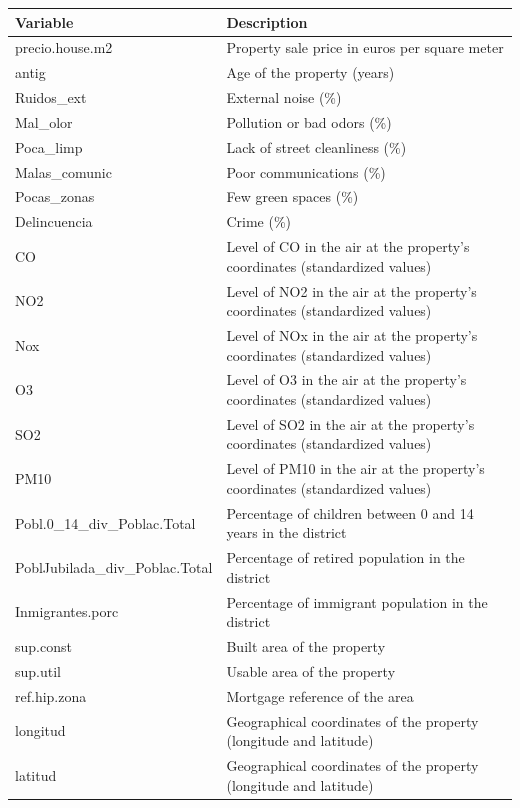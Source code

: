 \documentclass[11pt]{report} %
\begin{document}
\begin{longtable}[H]
\centering
\caption{Continuous Variables in Data Set}
\label{tab:cont_table}
\begin{tabular}{@{}lp{10cm}@{}}
\toprule
\textbf{Variable} & \textbf{Description} \\ \midrule
precio.house.m2 & Property sale price in euros per square meter \\ 
antig & Age of the property (years) \\ 
Ruidos\_ext & External noise (\%) \\ 
Mal\_olor & Pollution or bad odors (\%) \\ 
Poca\_limp & Lack of street cleanliness (\%) \\ 
Malas\_comunic & Poor communications (\%) \\ 
Pocas\_zonas & Few green spaces (\%) \\ 
Delincuencia & Crime (\%) \\ 
CO & Level of CO in the air at the property's coordinates (standardized values) \\ 
NO2 & Level of NO2 in the air at the property's coordinates (standardized values) \\ 
Nox & Level of NOx in the air at the property's coordinates (standardized values) \\ 
O3 & Level of O3 in the air at the property's coordinates (standardized values) \\ 
SO2 & Level of SO2 in the air at the property's coordinates (standardized values) \\ 
PM10 & Level of PM10 in the air at the property's coordinates (standardized values) \\ 
Pobl.0\_14\_div\_Poblac.Total & Percentage of children between 0 and 14 years in the district \\ 
PoblJubilada\_div\_Poblac.Total & Percentage of retired population in the district \\ 
Inmigrantes.porc & Percentage of immigrant population in the district \\ 
sup.const & Built area of the property \\ 
sup.util & Usable area of the property \\ 
ref.hip.zona & Mortgage reference of the area \\ 
longitud & Geographical coordinates of the property (longitude and latitude) \\ 
latitud & Geographical coordinates of the property (longitude and latitude) \\ \bottomrule
\end{tabular}
\end{longtable}
\end{document}
